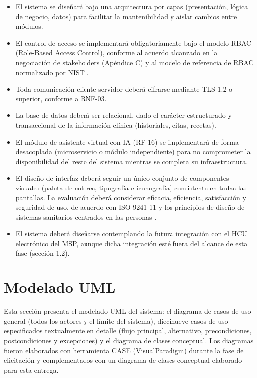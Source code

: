 \documentclass[11pt,a4paper]{article}
\providecommand{\tightlist}{%
	\setlength{\itemsep}{0pt}\setlength{\parskip}{0pt}}
\begin{document}
	\begin{itemize}
		\tightlist
		\item
		El sistema se diseñará bajo una arquitectura por capas (presentación, lógica de negocio, datos) para facilitar la mantenibilidad y aislar cambios entre módulos.
		\item
		El control de acceso se implementará obligatoriamente bajo el modelo RBAC (Role-Based Access Control), conforme al acuerdo alcanzado en la negociación de stakeholders (Apéndice C) y al modelo de referencia de RBAC normalizado por NIST \cite{sandhu2000,nist80053}.
		\item
		Toda comunicación cliente-servidor deberá cifrarse mediante TLS 1.2 o superior, conforme a RNF-03.
		\item
		La base de datos deberá ser relacional, dado el carácter estructurado y transaccional de la información clínica (historiales, citas, recetas).
		\item
		El módulo de asistente virtual con IA (RF-16) se implementará de forma desacoplada (microservicio o módulo independiente) para no comprometer la disponibilidad del resto del sistema mientras se completa su infraestructura.
		\item
		El diseño de interfaz deberá seguir un único conjunto de componentes visuales (paleta de colores, tipografía e iconografía) consistente en todas las pantallas. La evaluación deberá considerar eficacia, eficiencia, satisfacción y seguridad de uso, de acuerdo con ISO 9241-11 y los principios de diseño de sistemas sanitarios centrados en las personas \cite{iso9241,carayon2014}.
		\item
		El sistema deberá diseñarse contemplando la futura integración con el HCU electrónico del MSP, aunque dicha integración esté fuera del alcance de esta fase (sección 1.2).
	\end{itemize}
	
	
	
	\section{Modelado UML}
	
	Esta sección presenta el modelado UML del sistema: el diagrama de casos de uso general (todos los actores y el límite del sistema), diecinueve casos de uso especificados textualmente en detalle (flujo principal, alternativo, precondiciones, postcondiciones y excepciones) y el diagrama de clases conceptual. Los diagramas fueron elaborados con herramienta CASE (VisualParadigm) durante la fase de elicitación y complementados con un diagrama de clases conceptual elaborado para esta entrega.
	
\end{document}

